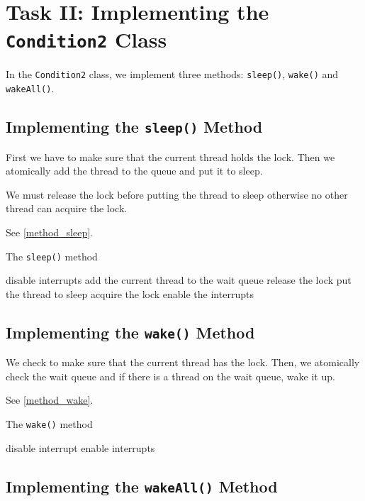 \documentclass[12pt, letterpaper]{report}
\newcommand{\code}[1]{\texttt{#1}}
\begin{document}
\section*{Task II: Implementing the \code{Condition2} Class}

In the \code{Condition2} class, we implement three methods: \code{sleep()}, \code{wake()} and \code{wakeAll()}.

\subsection*{Implementing the \code{sleep()} Method}

First we have to make sure that the current thread holds the lock. Then we atomically add the thread to the queue and put it to sleep.

We must release the lock before putting the thread to sleep otherwise no other thread can acquire the lock.

See \vref{method_sleep}.

\begin{algorithm}[!ht]
  \caption{The \code{sleep()} method}
  \label{method_sleep}
    \SetAlgoLined
    disable interrupts\;
    add the current thread to the wait queue\;
    release the lock\;
    put the thread to sleep\;
    acquire the lock\;
    enable the interrupts\;
\end{algorithm}

\subsection*{Implementing the \code{wake()} Method}

We check to make sure that the current thread has the lock. Then, we atomically check the wait queue and if there is a thread on the wait queue, wake it up.

See \vref{method_wake}.

\begin{algorithm}[!ht]
  \caption{The \code{wake()} method}
  \label{method_wake}
    \SetAlgoLined
    disable interrupt\;
    enable interrupts\;
\end{algorithm}

\subsection*{Implementing the \code{wakeAll()} Method}
\end{document}
